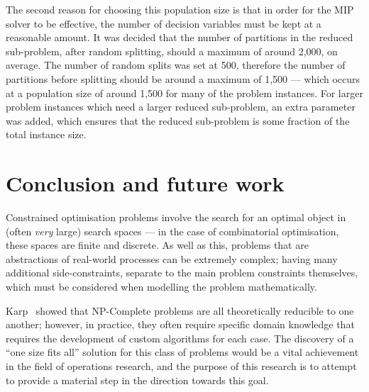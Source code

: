 \documentclass[journal]{IEEEtran}
\begin{document}
The second reason for choosing this population size is that in order for the MIP solver to be effective, the number of decision variables must be kept at a reasonable amount. It was decided that the number of partitions in the reduced sub-problem, after random splitting, should a maximum of around 2,000, on average. The number of random splits was set at 500, therefore the number of partitions before splitting should be around a maximum of 1,500 --- which occurs at a population size of around 1,500 for many of the problem instances. For larger problem instances which need a larger reduced sub-problem, an extra parameter was added, which ensures that the reduced sub-problem is some fraction of the total instance size.

\section{Conclusion and future work}

Constrained optimisation problems involve the search for an optimal object in (often \emph{very} large) search spaces --- in the case of combinatorial optimisation, these spaces are finite and discrete. As well as this, problems that are abstractions of real-world processes can be extremely complex; having many additional side-constraints, separate to the main problem constraints themselves, which must be considered when modelling the problem mathematically.

Karp~\cite{np:karp} showed that NP-Complete problems are all theoretically reducible to one another; however, in practice, they often require specific domain knowledge that requires the development of custom algorithms for each case. The discovery of a ``one size fits all'' solution for this class of problems would be a vital achievement in the field of operations research, and the purpose of this research is to attempt to provide a material step in the direction towards this goal.
\end{document}
